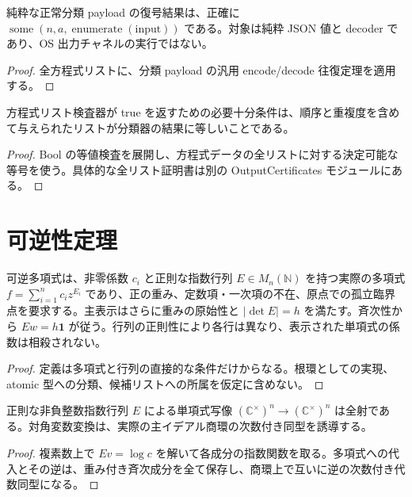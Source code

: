 \begin{theorem}
\label{thm:payload}
\leanok
純粋な正常分類 payload の復号結果は、正確に $\operatorname{some}(n,a,\operatorname{enumerate}(\mathrm{input}))$ である。対象は純粋 JSON 値と decoder であり、OS 出力チャネルの実行ではない。
\end{theorem}
\begin{proof}
\leanok
{}
全方程式リストに、分類 payload の汎用 encode/decode 往復定理を適用する。
\end{proof}

\begin{theorem}[出力リスト全体の検査]
\label{thm:checker}
\leanok
方程式リスト検査器が true を返すための必要十分条件は、順序と重複度を含めて与えられたリストが分類器の結果に等しいことである。
\end{theorem}
\begin{proof}
\leanok
{}
Bool の等値検査を展開し、方程式データの全リストに対する決定可能な等号を使う。具体的な全リスト証明書は別の OutputCertificates モジュールにある。
\end{proof}

\section{可逆性定理}

\begin{definition}[可逆多項式と主表示]
\label{def:invertible}
\leanok
可逆多項式は、非零係数 $c_i$ と正則な指数行列 $E\in M_n(\mathbb N)$ を持つ実際の多項式 $f=\sum_{i=1}^n c_i z^{E_i}$ であり、正の重み、定数項・一次項の不在、原点での孤立臨界点を要求する。主表示はさらに重みの原始性と $|\det E|=h$ を満たす。斉次性から $Ew=h\mathbf1$ が従う。行列の正則性により各行は異なり、表示された単項式の係数は相殺されない。
\end{definition}
\begin{proof}
\leanok
{}
定義は多項式と行列の直接的な条件だけからなる。根環としての実現、atomic 型への分類、候補リストへの所属を仮定に含めない。
\end{proof}

\begin{theorem}[任意の非零係数の正規化]
\label{thm:diagonal}
\leanok
正則な非負整数指数行列 $E$ による単項式写像 $(\mathbb C^\times)^n\to(\mathbb C^\times)^n$ は全射である。対角変数変換は、実際の主イデアル商環の次数付き同型を誘導する。
\end{theorem}
\begin{proof}
\leanok
{}
複素数上で $Ev=\log c$ を解いて各成分の指数関数を取る。多項式への代入とその逆は、重み付き斉次成分を全て保存し、商環上で互いに逆の次数付き代数同型になる。
\end{proof}

